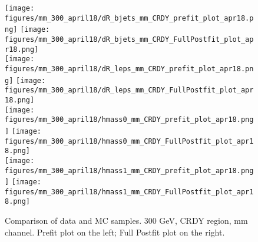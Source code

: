 \begin{figure}[H]
\begin{center}
\texttt{[image: figures/mm\_300\_april18/dR\_bjets\_mm\_CRDY\_prefit\_plot\_apr18.png]}
\texttt{[image: figures/mm\_300\_april18/dR\_bjets\_mm\_CRDY\_FullPostfit\_plot\_apr18.png]}\\
\texttt{[image: figures/mm\_300\_april18/dR\_leps\_mm\_CRDY\_prefit\_plot\_apr18.png]}
\texttt{[image: figures/mm\_300\_april18/dR\_leps\_mm\_CRDY\_FullPostfit\_plot\_apr18.png]}\\
\texttt{[image: figures/mm\_300\_april18/hmass0\_mm\_CRDY\_prefit\_plot\_apr18.png]}
\texttt{[image: figures/mm\_300\_april18/hmass0\_mm\_CRDY\_FullPostfit\_plot\_apr18.png]}\\
\texttt{[image: figures/mm\_300\_april18/hmass1\_mm\_CRDY\_prefit\_plot\_apr18.png]}
\texttt{[image: figures/mm\_300\_april18/hmass1\_mm\_CRDY\_FullPostfit\_plot\_apr18.png]}\\
\caption[Data-MC comparison in CRDY.]{Comparison of data and MC samples. 300 GeV, CRDY region, mm channel. Prefit plot on the left; Full Postfit plot on the right.}
\label{MCcomparisons_mm_low_CRDY}
\end{center}
\end{figure}

